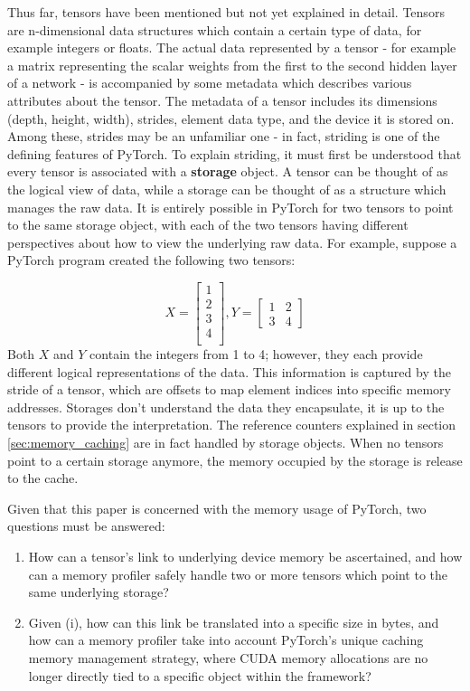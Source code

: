 \documentclass[12pt,letterpaper]{article}
\begin{document}
\label{sec:tensors_in_pytorch}
Thus far, tensors have been mentioned but not yet explained in detail. Tensors are n-dimensional data structures which contain a certain type of data, for example integers or floats. The actual data represented by a tensor - for example a matrix representing the scalar weights from the first to the second hidden layer of a network - is accompanied by some metadata which describes various attributes about the tensor. The metadata of a tensor includes its dimensions (depth, height, width), strides, element data type, and the device it is stored on. Among these, strides may be an unfamiliar one - in fact, striding is one of the defining features of PyTorch. To explain striding, it must first be understood that every tensor is associated with a \textbf{storage} object. A tensor can be thought of as the logical view of data, while a storage can be thought of as a structure which manages the raw data. It is entirely possible in PyTorch for two tensors to point to the same storage object, with each of the two tensors having different perspectives about how to view the underlying raw data. For example, suppose a PyTorch program created the following two tensors:

\[
X =
\begin{bmatrix}
    1      \\
    2      \\
    3      \\
    4      \\
\end{bmatrix} 
,
Y =
\begin{bmatrix}
    1  &  2      \\
    3  &  4      
\end{bmatrix} 
\]
Both $X$ and $Y$ contain the integers from 1 to 4; however, they each provide different logical representations of the data. This information is captured by the stride of a tensor, which are offsets to map element indices into specific memory addresses. Storages don't understand the data they encapsulate, it is up to the tensors to provide the interpretation. The reference counters explained in section \ref{sec:memory_caching} are in fact handled by storage objects. When no tensors point to a certain storage anymore, the memory occupied by the storage is release to the cache.  
\par 

Given that this paper is concerned with the memory usage of PyTorch, two questions must be answered:
\begin{enumerate}[label=(\roman*)]
  \item How can a tensor's link to underlying device memory be ascertained, and how can a memory profiler safely handle two or more tensors which point to the same underlying storage?
  \item Given (i), how can this link be translated into a specific size in bytes, and how can a memory profiler take into account PyTorch's unique caching memory management strategy, where CUDA memory allocations are no longer directly tied to a specific object within the framework?
\end{enumerate}
\end{document}
